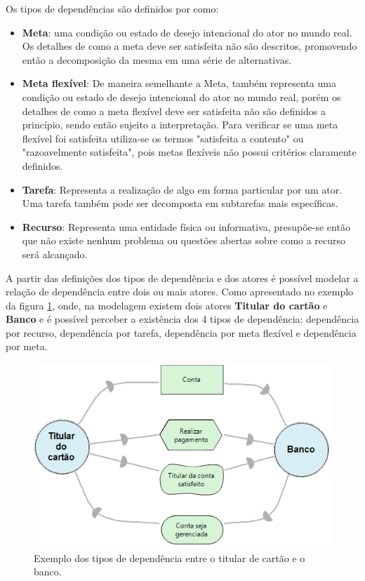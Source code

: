 Os tipos de dependências são definidos por \cite{istarwiki20} como: 

\begin{itemize}
	\item \textbf{Meta}: uma condição ou estado de desejo intencional do ator no mundo real. Os detalhes de como a meta deve ser satisfeita não são descritos, promovendo então a decomposição da mesma em uma série de alternativas.   
	\item \textbf{Meta flexível}: De maneira semelhante a Meta, também representa uma condição ou estado de desejo intencional do ator no mundo real, porém os detalhes de como a meta flexível deve ser satisfeita não são definidos a princípio, sendo então sujeito a interpretação. Para verificar se uma meta flexível foi satisfeita utiliza-se os termos "satisfeita a contento" ou "razoavelmente satisfeita", pois metas flexíveis não possui critérios claramente definidos. 
	\item \textbf{Tarefa}: Representa a realização de algo em forma particular por um ator. Uma tarefa também pode ser decomposta em subtarefas mais específicas. 
	\item \textbf{Recurso}: Representa uma entidade física ou informativa, presupõe-se então que não existe nenhum problema ou questões abertas sobre como a recurso será alcançado. 
\end{itemize}

A partir das definições dos tipos de dependência e dos atores é possível modelar a relação de dependência entre dois ou mais atores. Como apresentado no exemplo da figura \ref{exemploTipoDeDepencia}, onde, na modelagem existem dois atores \textbf{Titular do cartão} e \textbf{Banco} e é possível perceber a existência dos 4 tipos de dependência: dependência por recurso, dependência por tarefa, dependência por meta flexível e dependência por meta.  

\begin{figure}[h!]
	\centering
	\includegraphics[keepaspectratio=true,scale=1.0]{figuras/ExemploTiposDeDependecias.PNG}
	\caption{Exemplo dos tipos de dependência entre o titular de cartão e o banco.}
	\label{exemploTipoDeDepencia}
\end{figure} 


